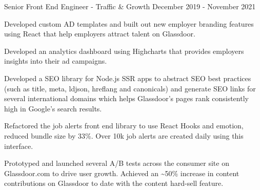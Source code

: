 \begin{cventries}
  \cventry
    {Senior Front End Engineer - Traffic \& Growth} %
    { } %
    { } %
    {December 2019 - November 2021} %
    {
      \begin{cvitems} %
        \item {Developed custom AD templates and built out new employer branding features using React that help employers attract talent on Glassdoor.}
        \item {Developed an analytics dashboard using Highcharts that provides employers insights into their ad campaigns.}
        \item {Developed a SEO library for Node.js SSR apps to abstract SEO best practices (such as title, meta, ldjson, hreflang and canonicals) and generate SEO links for several international domains which helps Glassdoor's pages rank consistently high in Google's search results.}
        \item {Refactored the job alerts front end library to use React Hooks and emotion, reduced bundle size by 33\%. Over 10k job alerts are created daily using this interface.}
        \item {Prototyped and launched several A/B tests across the consumer site on Glassdoor.com to drive user growth. Achieved an \textasciitilde50\% increase in content contributions on Glassdoor to date with the content hard-sell feature.}
      \end{cvitems}
    }



\end{cventries}
